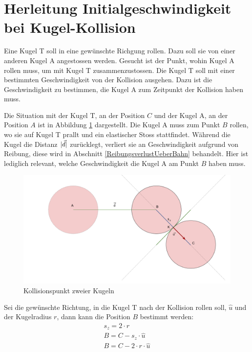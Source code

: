 \section{Herleitung Initialgeschwindigkeit bei Kugel-Kollision}\label{anhang:herleitung:ballCollisionReverse}
Eine Kugel T soll in eine gewünschte Richgung rollen. Dazu soll sie von einer anderen Kugel A angestossen werden.
Gesucht ist der Punkt, wohin Kugel A rollen muss, um mit Kugel T zusammenzustossen.
Die Kugel T soll mit einer bestimmten Geschwindigkeit von der Kollision ausgehen.
Dazu ist die Geschwindigkeit zu bestimmen, die Kugel A  zum Zeitpunkt der Kollision haben muss.

Die Situation mit der Kugel T, an der Position $C$ und der Kugel A, an der Position $A$ ist in Abbildung \ref{fig:ballCollisionPointReverse_anhang}
dargestellt. Die Kugel A muss zum Punkt $B$ rollen, wo sie auf Kugel T prallt und ein elastischer Stoss\cite{wiki.elastischer_stoss_physik:1} stattfindet.
Während die Kugel die Distanz $\lvert \vec{d} \rvert$ zurücklegt, verliert sie an Geschwindigkeit aufgrund von Reibung,
diese wird in Abschnitt \ref{ReibungsverlustUeberBahn} behandelt. Hier ist lediglich relevant, welche Geschwindigkeit
die Kugel A am Punkt $B$ haben muss.

\begin{figure}[h!]
    \begin{center}
        \includegraphics[width=0.6\linewidth]{../common/03_billiard_ai/resources/21_kollisionspunkt_rueckwaerts.png}
    \end{center}
    \caption{Kollisionspunkt zweier Kugeln}
    \label{fig:ballCollisionPointReverse_anhang}
\end{figure}

Sei die gewünschte Richtung, in die Kugel T nach der Kollision rollen soll, $\hat{u}$ und der Kugelradius $r$, dann kann die Position $B$ bestimmt werden:
\begin{align}
    s_z = 2 \cdot r\\
    B = C - s_z \cdot \hat{u}\\
    B = C - 2 \cdot r \cdot \hat{u}
\end{align}

